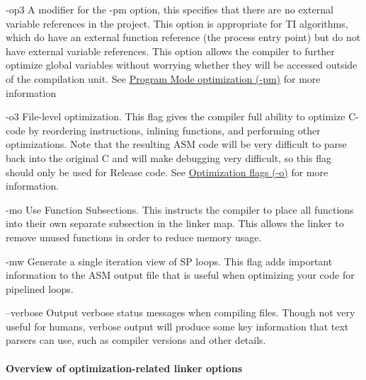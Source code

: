 \begin{DoxyItemize}
\item {\ttfamily -\/op3}  A modifier for the -\/pm option, this specifies that there are no external variable references in the project. This option is appropriate for T\+I algorithms, which do have an external function reference (the process entry point) but do not have external variable references. This option allows the compiler to further optimize global variables without worrying whether they will be accessed outside of the compilation unit. See \hyperlink{a00362_subsubsection__program_mode_optimization_pm_}{Program Mode optimization (-\/pm)} for more information  


\item {\ttfamily -\/o3}  File-\/level optimization. This flag gives the compiler full ability to optimize C-\/code by reordering instructions, inlining functions, and performing other optimizations. Note that the resulting A\+S\+M code will be very difficult to parse back into the original C and will make debugging very difficult, so this flag should only be used for Release code. See \hyperlink{a00362_subsubsection__optimization_flags_o_}{Optimization flags (-\/o)} for more information.  


\item {\ttfamily -\/mo}  Use Function Subsections. This instructs the compiler to place all functions into their own separate subsection in the linker map. This allows the linker to remove unused functions in order to reduce memory usage.  


\item {\ttfamily -\/mw}  Generate a single iteration view of S\+P loops. This flag adds important information to the A\+S\+M output file that is useful when optimizing your code for pipelined loops.  


\item {\ttfamily –verbose}  Output verbose status messages when compiling files. Though not very useful for humans, verbose output will produce some key information that text parsers can use, such as compiler versions and other details.  


\end{DoxyItemize}

\hypertarget{a00362_subsubsection__overview_of_optimizationrelated_linker_options_}{}\paragraph{Overview of optimization-\/related linker options}\label{a00362_subsubsection__overview_of_optimizationrelated_linker_options_}
 
